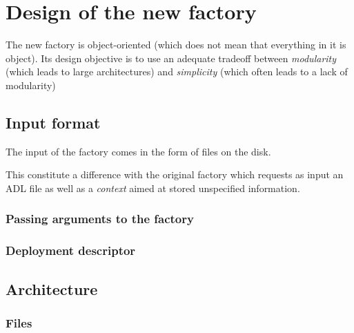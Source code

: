 \documentclass{article}
\newcommand{\code}[1]{\texttt{#1}}
\begin{document}
\section{Design of the new factory}
The new factory is object-oriented (which does not mean that everything in it is object). Its design objective is to use an adequate tradeoff between {\em modularity} (which
leads to large architectures) and {\em simplicity} (which often leads to a lack of modularity)


\subsection{Input format}


The input of the factory comes in the form of files on the disk.

This constitute a difference with the original factory which requests as input 
an ADL file as well as a \textit{context} aimed at stored unspecified information.


\subsubsection{Passing arguments to the factory}


\subsubsection{Deployment descriptor}


\subsection{Architecture}


\subsubsection{Files}
\end{document}

